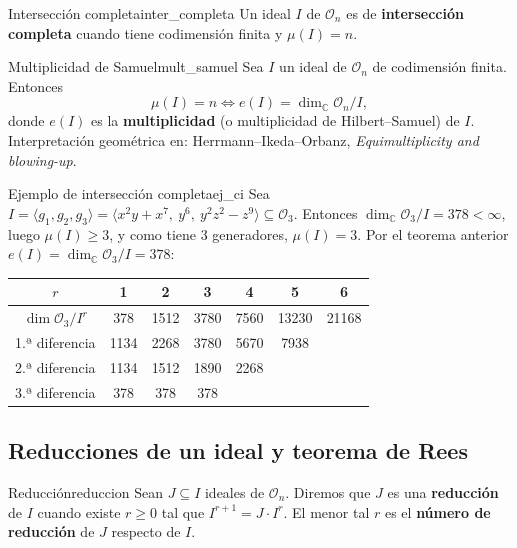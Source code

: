 \documentclass[11pt,a4paper]{article}
\begin{document}
\begin{definicion}{Intersección completa}{inter_completa}
Un ideal $I$ de $\mathcal{O}_n$ es de \textbf{intersección completa} cuando tiene codimensión finita y $\mu(I) = n$.
\end{definicion}

\begin{teorema}{Multiplicidad de Samuel}{mult_samuel}
Sea $I$ un ideal de $\mathcal{O}_n$ de codimensión finita. Entonces
$$ \mu(I) = n \iff e(I) = \dim_{\mathbb{C}} \mathcal{O}_n/I, $$
donde $e(I)$ es la \textbf{multiplicidad} (o multiplicidad de Hilbert--Samuel) de $I$. Interpretación geométrica en: Herrmann--Ikeda--Orbanz, \emph{Equimultiplicity and blowing-up}.
\end{teorema}

\begin{observacion}{Ejemplo de intersección completa}{ej_ci}
Sea $I = \langle g_1, g_2, g_3 \rangle = \langle x^2y + x^7,\ y^6,\ y^2z^2 - z^9 \rangle \subseteq \mathcal{O}_3$. Entonces $\dim_{\mathbb{C}} \mathcal{O}_3/I = 378 < \infty$, luego $\mu(I) \ge 3$, y como tiene 3 generadores, $\mu(I) = 3$. Por el teorema anterior $e(I) = \dim_{\mathbb{C}} \mathcal{O}_3/I = 378$:
\begin{center}
\begin{tabular}{c|cccccc}
$r$ & 1 & 2 & 3 & 4 & 5 & 6 \\ \hline
$\dim \mathcal{O}_3/I^r$ & 378 & 1512 & 3780 & 7560 & 13230 & 21168 \\
1.ª diferencia & 1134 & 2268 & 3780 & 5670 & 7938 & \\
2.ª diferencia & 1134 & 1512 & 1890 & 2268 & & \\
3.ª diferencia & 378 & 378 & 378 & & &
\end{tabular}
\end{center}
\end{observacion}

\subsection*{Reducciones de un ideal y teorema de Rees}

\begin{definicion}{Reducción}{reduccion}
Sean $J \subseteq I$ ideales de $\mathcal{O}_n$. Diremos que $J$ es una \textbf{reducción} de $I$ cuando existe $r \ge 0$ tal que $I^{r+1} = J \cdot I^r$. El menor tal $r$ es el \textbf{número de reducción} de $J$ respecto de $I$.
\end{definicion}
\end{document}
